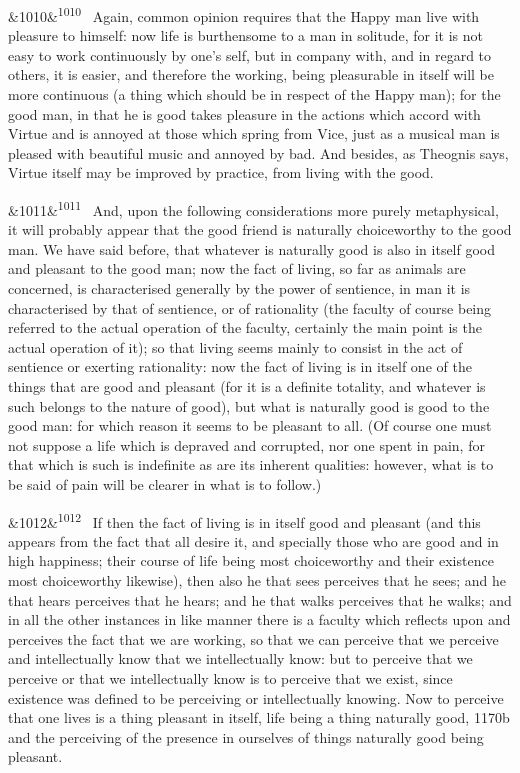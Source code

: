 \documentclass[12pt]{article}
\newcommand{\para}[1][]{\par\noindent\ifx&#1&\else\textsuperscript{\footnotesize #1}~\fi}
\begin{document}
\para[1010] Again, common opinion requires that the Happy man live with pleasure to himself: now life is burthensome to a man in solitude, for it is not easy to work continuously by one's self, but in company with, and in regard to others, it is easier, and therefore the working, being pleasurable in itself will be more continuous (a thing which should be in respect of the Happy man); for the good man, in that he is good takes pleasure in the actions which accord with Virtue and is annoyed at those which spring from Vice, just as a musical man is pleased with beautiful music and annoyed by bad. And besides, as Theognis says, Virtue itself may be improved by practice, from living with the good.

\para[1011] And, upon the following considerations more purely metaphysical, it will probably appear that the good friend is naturally choiceworthy to the good man. We have said before, that whatever is naturally good is also in itself good and pleasant to the good man; now the fact of living, so far as animals are concerned, is characterised generally by the power of sentience, in man it is characterised by that of sentience, or of rationality (the faculty of course being referred to the actual operation of the faculty, certainly the main point is the actual operation of it); so that living seems mainly to consist in the act of sentience or exerting rationality: now the fact of living is in itself one of the things that are good and pleasant (for it is a definite totality, and whatever is such belongs to the nature of good), but what is naturally good is good to the good man: for which reason it seems to be pleasant to all. (Of course one must not suppose a life which is depraved and corrupted, nor one spent in pain, for that which is such is indefinite as are its inherent qualities: however, what is to be said of pain will be clearer in what is to follow.)

\para[1012] If then the fact of living is in itself good and pleasant (and this appears from the fact that all desire it, and specially those who are good and in high happiness; their course of life being most choiceworthy and their existence most choiceworthy likewise), then also he that sees perceives that he sees; and he that hears perceives that he hears; and he that walks perceives that he walks; and in all the other instances in like manner there is a faculty which reflects upon and perceives the fact that we are working, so that we can perceive that we perceive and intellectually know that we intellectually know: but to perceive that we perceive or that we intellectually know is to perceive that we exist, since existence was defined to be perceiving or intellectually knowing. Now to perceive that one lives is a thing pleasant in itself, life being a thing naturally good, 1170b and the perceiving of the presence in ourselves of things naturally good being pleasant.
\end{document}
